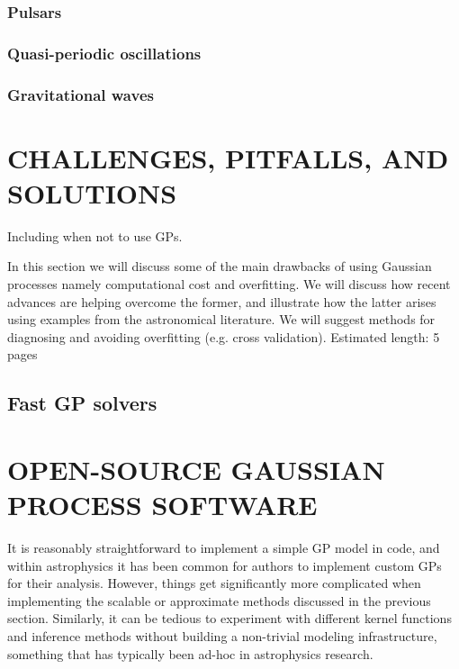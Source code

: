 \documentclass[letterpaper]{ar-1col}
\begin{document}
\subsubsection{Pulsars}

\subsubsection{Quasi-periodic oscillations}

\subsubsection{Gravitational waves}

\section{CHALLENGES, PITFALLS, AND SOLUTIONS}
\label{sec:challenges}

Including when not to use GPs.

In this section we will discuss some of the main drawbacks of using Gaussian processes namely computational cost and overfitting. We will discuss how recent advances are helping overcome the former, and illustrate how the latter arises using examples from the astronomical literature. We will suggest methods for diagnosing and avoiding overfitting (e.g. cross validation). Estimated length: 5 pages

\subsection{Fast GP solvers}
\label{sec:fast}

\section{OPEN-SOURCE GAUSSIAN PROCESS SOFTWARE}

It is reasonably straightforward to implement a simple GP model in code, and within astrophysics it has been common for authors to implement custom GPs for their analysis.
However, things get significantly more complicated when implementing the scalable or approximate methods discussed in the previous section.
Similarly, it can be tedious to experiment with different kernel functions and inference methods without building a non-trivial modeling infrastructure, something that has typically been ad-hoc in astrophysics research.
\end{document}
